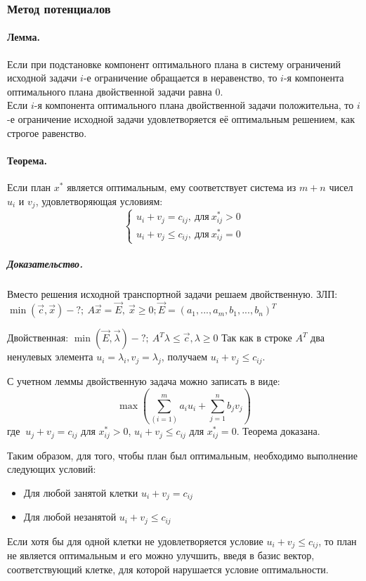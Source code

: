 \documentclass[a4paper, 14pt]{extarticle}
\numberwithin{equation}{section}
\begin{document}
\subsubsection{Метод потенциалов}
\paragraph{Лемма.} Если при подстановке компонент оптимального плана в систему ограничений исходной задачи $i$-е ограничение обращается в неравенство, то $i$-я компонента оптимального плана двойственной задачи равна $0$. \\
Если $i$-я компонента оптимального плана двойственной задачи положительна, то $i$-е ограничение исходной задачи удовлетворяется её оптимальным решением, как строгое равенство. 

\paragraph{Теорема.} Если план $x^*$ является оптимальным, ему соответствует система из $m+n$ чисел $u_i$ и $v_j$, удовлетворяющая условиям:
\[ \begin{cases}
        u_i + v_j = c_{ij}, \ \textrm{для} \ x_{ij}^* > 0\\
        u_i + v_j \le c_{ij}, \ \textrm{для} \ x_{ij}^* = 0
\end{cases}\]

\subparagraph{Доказательство.} Вместо решения исходной транспортной задачи решаем двойственную.
ЗЛП: $\min ( \vec{c}, \vec{x}) -?; \ A \vec{x} = \vec{E}, \ \vec{x} \ge 0; \vec{E} = (a_1, ..., a_m, b_1, ..., b_n)^T $

Двойственная: $\min ( \vec{E}, \vec{\lambda}) - ? ; \ A^T \lambda \le \vec{c}, \lambda \ge 0$ 
Так как в строке $A^T$ два ненулевых элемента $u_i = \lambda_i, v_j = \lambda_j$, получаем $u_i + v_j \le c_{ij} $.

С учетном леммы двойственную задача можно записать в виде:
\[ \max \left( \sum^m_(i=1) a_i u_i + \sum^{n}_{j=1} b_j v_j \right)\] 
    где $\ u_j + v_j = c_{ij}$ для  $x^*_{ij} > 0$, $u_i + v_j \le c_{ij}$ для $x^*_{ij} = 0 $.
Теорема доказана.

Таким образом, для того, чтобы план был оптимальным, необходимо выполнение следующих условий:
\begin{itemize}
    \item Для любой занятой клетки $u_i + v_j = c_{ij}$
    \item Для любой незанятой $u_i+v_j \le c_{ij}$
\end{itemize}
Если хотя бы для одной клетки не удовлетворяется условие $u_i + v_j \le c_{ij}$, то план не является оптимальным и его можно улучшить, введя в базис вектор, соответствующий клетке, для которой нарушается условие оптимальности.
\end{document}
